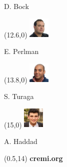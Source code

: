 \documentclass[aspectratio=169,table]{beamer}
\begin{document}
\begin{frame}
\begin{textblock}{3}
        D. Bock%
    \end{textblock}%
    
    \begin{textblock}{3}(12.6,0)
        \tiny\includegraphics[width=1cm]{fig/people/perlman.jpeg}
        
        E. Perlman%
    \end{textblock}%
    
    \begin{textblock}{3}(13.8,0)
        \tiny\includegraphics[width=1cm]{fig/people/turaga.jpg}
        
        S. Turaga%
    \end{textblock}%

    \begin{textblock}{3}(15,0)
        \tiny\includegraphics[width=1cm]{fig/people/haddad.jpg}
        
        A. Haddad%
    \end{textblock}%
    
    \begin{textblock}{3}(0.5,14)
        {\color{white}\Huge\bf cremi.org}
    \end{textblock}
\end{frame}
\end{document}
